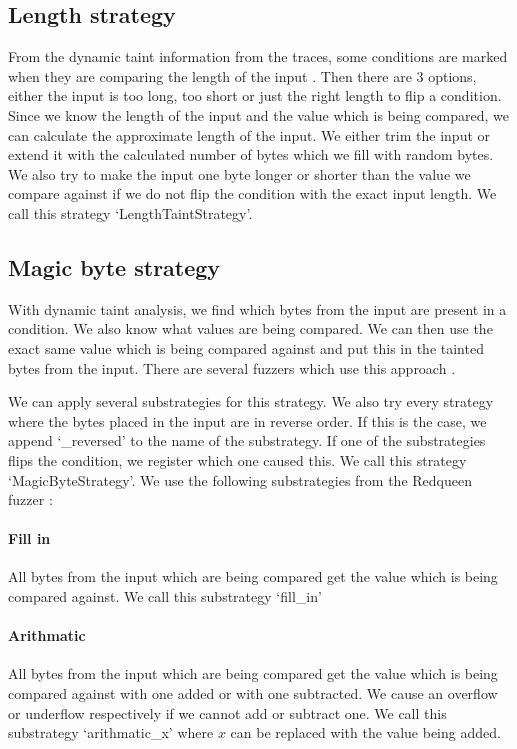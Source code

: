 \subsection{Length strategy}
From the dynamic taint information from the traces, some conditions are marked when they are comparing the length of the input \cite{chen2018angora}. Then there are 3 options, either the input is too long, too short or just the right length to flip a condition. Since we know the length of the input and the value which is being compared, we can calculate the approximate length of the input. We either trim the input or extend it with the calculated number of bytes which we fill with random bytes. We also try to make the input one byte longer or shorter than the value we compare against if we do not flip the condition with the exact input length.
We call this strategy `LengthTaintStrategy'.

\subsection{Magic byte strategy}
With dynamic taint analysis, we find which bytes from the input are present in a condition. We also know what values are being compared. We can then use the exact same value which is being compared against and put this in the tainted bytes from the input.
There are several fuzzers which use this approach \cite{rawat2017vuzzer, aschermann2019redqueen}.

We can apply several substrategies for this strategy. We also try every strategy where the bytes placed in the input are in reverse order. If this is the case, we append `\_reversed' to the name of the substrategy. If one of the substrategies flips the condition, we register which one caused this. We call this strategy `MagicByteStrategy'.
We use the following substrategies from the Redqueen fuzzer \cite{aschermann2019redqueen}:
\paragraph{Fill in}
All bytes from the input which are being compared get the value which is being compared against.
We call this substrategy `fill\_in'
\paragraph{Arithmatic}
All bytes from the input which are being compared get the value which is being compared against with one added or with one subtracted. We cause an overflow or underflow respectively if we cannot add or subtract one. %
We call this substrategy `arithmatic\_x' where $x$ can be replaced with the value being added.

